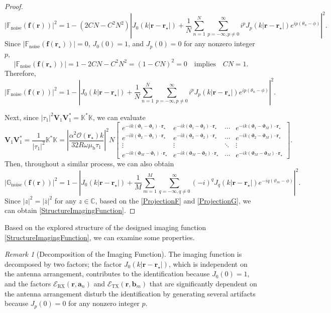\documentclass[3p,10pt]{elsarticle}
\newcommand{\mub}{\mu_\mathrm{b}}
\newcommand{\ma}{\mathbf{a}}
\newcommand{\mb}{\mathbf{b}}
\newcommand{\mf}{\mathbf{f}}
\newcommand{\mr}{\mathbf{r}}
\newcommand{\mV}{\mathbf{V}}
\newcommand{\vv}{\boldsymbol{\vartheta}}
\DeclareMathOperator*{\noise}{noise}
\DeclareMathOperator*{\tx}{TX}
\DeclareMathOperator*{\rx}{RX}
\theoremstyle{plain}
\theoremstyle{remark}
\newtheorem{remark}{Remark}[section]
\begin{document}
\begin{proof}
\[|\mathbb{F}_{\noise}(\mf(\mr))|^2=1-(2CN-C^2N^2)\left|J_0(k|\mr-\mr_\star|)+\frac{1}{N}\sum_{n=1}^{N}\sum_{p=-\infty,p\ne0}^{\infty}i^pJ_p(k|\mr-\mr_\star|)e^{ip(\theta_n-\phi)}\right|^2.\]
Since $|\mathbb{F}_{\noise}(\mf(\mr_\star))|=0$, $J_0(0)=1$, and $J_p(0)=0$ for any nonzero integer $p$,
\[|\mathbb{F}_{\noise}(\mf(\mr_\star))|=1-2CN-C^2N^2=(1-CN)^2=0\quad\text{implies}\quad CN=1.\]
Therefore,
\begin{equation}\label{ProjectionF}
|\mathbb{F}_{\noise}(\mf(\mr))|^2=1-\left|J_0(k|\mr-\mr_\star|)+\frac{1}{N}\sum_{n=1}^{N}\sum_{p=-\infty,p\ne0}^{\infty}i^pJ_p(k|\mr-\mr_\star|)e^{ip(\theta_n-\phi)}\right|^2.
\end{equation}

Next, since $|\tau_1|^2\mV_1\mV_1^*=\mathbb{K^*K}$, we can evaluate
\[\mV_1\mV_1^*=\frac{1}{|\tau_1|^2}\mathbb{K^*K}=\left|\frac{\alpha^2\mathcal{O}(\mr_\star)k}{32R\omega\mub\tau_1}\right|^2N\begin{bmatrix}
e^{-ik(\vv_1-\vv_1)\cdot\mr_\star} & e^{-ik(\vv_1-\vv_2)\cdot\mr_\star} & \cdots & e^{-ik(\vv_1-\vv_M)\cdot\mr_\star} \\
e^{-ik(\vv_2-\vv_1)\cdot\mr_\star} & e^{-ik(\vv_2-\vv_2)\cdot\mr_\star} & \cdots & e^{-ik(\vv_2-\vv_M)\cdot\mr_\star} \\
\vdots & \vdots & \ddots & \vdots \\
e^{-ik(\vv_M-\vv_1)\cdot\mr_\star} & e^{-ik(\vv_M-\vv_2)\cdot\mr_\star} & \cdots & e^{-ik(\vv_M-\vv_M)\cdot\mr_\star}
\end{bmatrix}.\]
Then, throughout a similar process, we can also obtain
\begin{equation}\label{ProjectionG}
|\mathbb{G}_{\noise}(\mf(\mr))|^2=1-\left|J_0(k|\mr-\mr_\star|)+\frac{1}{M}\sum_{m=1}^{M}\sum_{q=-\infty,q\ne0}^{\infty}(-i)^qJ_q(k|\mr-\mr_\star|)e^{-iq(\vartheta_m-\phi)}\right|^2.
\end{equation}
Since $|z|^2=|\overline{z}|^2$ for any $z\in\mathbb{C}$, based on the \eqref{ProjectionF} and \eqref{ProjectionG}, we can obtain \eqref{StructureImagingFunction}.
\end{proof}

Based on the explored structure of the designed imaging function \eqref{StructureImagingFunction}, we can examine some properties.

\begin{remark}[Decomposition of the Imaging Function]\label{Remark1}
The imaging function is decomposed by two factors; the factor $J_0(k|\mr-\mr_\star|)$, which is independent on the antenna arrangement, contributes to the identification because $J_0(0)=1$, and the factors $\mathcal{E}_{\rx}(\mr,\ma_n)$ and $\mathcal{E}_{\tx}(\mr,\mb_m)$ that are significantly dependent on the antenna arrangement disturb the identification by generating several artifacts because $J_p(0)=0$ for any nonzero integer $p$.
\end{remark}
\end{document}
